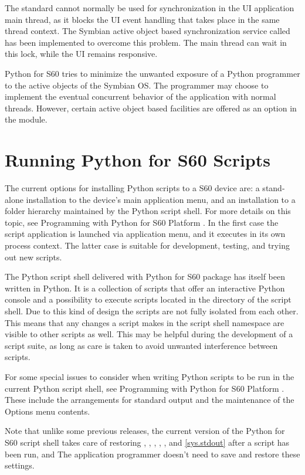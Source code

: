 The standard  cannot normally be used for 
synchronization in the UI application main thread, as it blocks the UI event 
handling that takes place in the same thread context. The Symbian active 
object based synchronization service called  has been 
implemented to overcome this problem. The main thread can wait in this lock, 
while the UI remains responsive.

Python for S60 tries to minimize the unwanted exposure of a Python 
programmer to the active objects of the Symbian OS. The programmer may 
choose to implement the eventual concurrent behavior of the application with 
normal threads. However, certain active object based facilities are offered 
as an option in the  module.

\section{Running Python for S60 Scripts}
\label{subsec:current}

The current options for installing Python scripts to a S60 device are:
a stand-alone installation to the device's main application menu, and
an installation to a folder hierarchy maintained by the Python script
shell. For more details on this topic, see Programming with Python for
S60 Platform \cite{PyS60Prog}. In the first case the script
application is launched via application menu, and it executes in its
own process context. The latter case is suitable for development,
testing, and trying out new scripts.

The Python script shell delivered with Python for S60 package has
itself been written in Python. It is a collection of scripts that
offer an interactive Python console and a possibility to execute
scripts located in the directory of the script shell. Due to this kind
of design the scripts are not fully isolated from each other. This
means that any changes a script makes in the script shell namespace
are visible to other scripts as well. This may be helpful during the
development of a script suite, as long as care is taken to avoid
unwanted interference between scripts.

For some special issues to consider when writing Python scripts to be
run in the current Python script shell, see Programming with Python
for S60 Platform \cite{PyS60Prog}. These include the arrangements for
standard output and the maintenance of the Options menu contents. 

\begin{notice}[note]
Note that unlike some previous releases, the current version of the
Python for S60 script shell takes care of restoring
, , 
, , 
,  and \ref{sys.stdout} 
after a script has been run, and The application programmer doesn't need
to save and restore these settings.
\end{notice}

